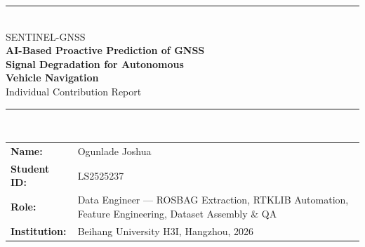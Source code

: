 \documentclass[12pt,a4paper]{article}
\newcommand{\code}[1]{\texttt{#1}}
\begin{document}

\begin{center}
  {\color{buaaNavy}\rule{\linewidth}{2pt}}\\[0.5cm]
  {\normalsize\color{buaaBlue} SENTINEL-GNSS}\\[0.25cm]
  {\LARGE\bfseries\color{buaaNavy} AI-Based Proactive Prediction of GNSS\\[0.2cm]
   Signal Degradation for Autonomous\\[0.4cm]
   Vehicle Navigation}\\[0.45cm]
  {\large\color{buaaBlue} Individual Contribution Report}\\[0.5cm]
  {\color{buaaNavy}\rule{\linewidth}{2pt}}\\[0.8cm]

  \begin{tabular}{ll}
    \textbf{Name:}        & Ogunlade Joshua \\
    \textbf{Student ID:}  & LS2525237 \\
    \textbf{Role:}        & Data Engineer --- ROSBAG Extraction, RTKLIB Automation,
                            Feature Engineering, Dataset Assembly \& QA \\
    \textbf{Institution:} & Beihang University H3I, Hangzhou, 2026 \\
  \end{tabular}
\end{center}
\vspace{0.8cm}

\begin{abstract}
This report documents my contributions to the SENTINEL-GNSS pilot project in complete
technical detail.
My primary responsibility was the end-to-end data engineering pipeline on which all model
training, validation, and evaluation rests.
This pipeline spans six stages: ROSBAG topic identification and raw data inspection,
automated GNSS extraction from ROS message bags (\code{extract\_gnss.py}), RTKLIB batch
processing for Single Point Positioning (\code{run\_rtklib.py}), derivation of 37
discriminative features from raw GNSS observables (\code{extract\_features.py}), master
dataset assembly with ground-truth labelling and causal sliding-window construction
(\code{assemble\_dataset.py}), and multi-pass dataset quality assurance including
leakage prevention and reproducibility versioning.

Beyond the core pipeline, I provided real-time field support during all five Scenario
A--E data collection sessions, verifying usability of each recording before the team
left the site.
I also independently processed the UrbanNav Hong Kong dataset through the same pipeline
to produce the cross-geography evaluation features used by Claudine's generalisation
study.
I authored Section~3 (Dataset \& Features) of the team paper.

The 149,662-window, 37-feature, 4-city dataset I assembled is the direct enabler of
SENTINEL's Macro-F1\,=\,0.821 and the EKF navigation improvements demonstrated in this
project.
This report explains every design decision in that pipeline, the three bugs found during
QA, and the lessons learned.
\end{abstract}
\end{document}
